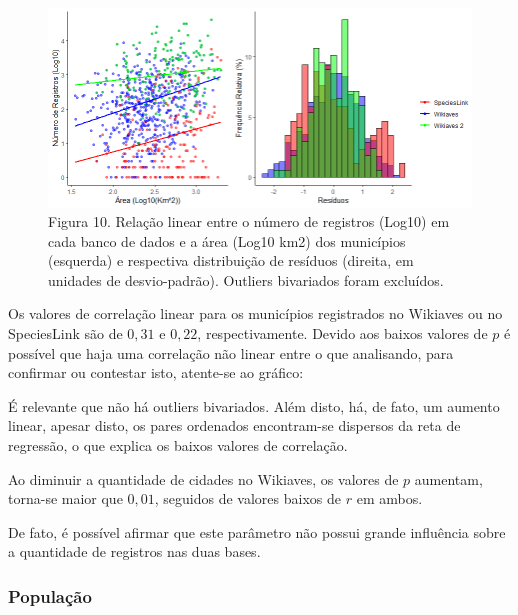 \begin{figure}[h!]
\centering
\includegraphics[width = 15cm]{Imagens/G02.png}
\\{\scriptsize Figura 10. Relação linear entre o número de registros (Log10) em cada banco de dados e a área (Log10 km2) dos municípios (esquerda) e respectiva distribuição de resíduos (direita, em unidades de desvio-padrão). Outliers bivariados foram excluídos.}
\end{figure}

\begin{resposta}
 Os valores de correlação linear para os municípios registrados no Wikiaves ou no SpeciesLink são de $0,31$ e $0,22$, respectivamente. Devido aos baixos valores de $p$ é possível que haja uma correlação não linear entre o que analisando, para confirmar ou contestar isto, atente-se ao gráfico: 
 
 É relevante que não há outliers bivariados. Além disto, há, de fato, um aumento linear, apesar disto, os pares ordenados encontram-se dispersos da reta de regressão, o que explica os baixos valores de correlação.

Ao diminuir a quantidade de cidades no Wikiaves, os valores de $p$ aumentam, torna-se maior que $0,01$, seguidos de valores baixos de $r$ em ambos. 

De fato, é possível afirmar que este parâmetro não possui grande influência sobre a quantidade de registros nas duas bases.
\end{resposta}



\subsubsection{População}

